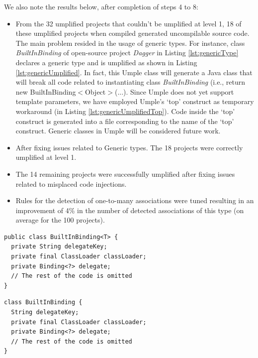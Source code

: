 We also note the results below, after completion of steps 4 to 8:

\begin{itemize}
\item  From the 32 umplified projects that couldn't be umplified at level 1, 18 of these umplified projects when compiled generated uncompilable source code. The main problem resided in the usage of generic types. For instance, class \textit{BuiltInBinding} of open-source project \textit{Dagger} in Listing \ref{lst:genericType} declares a generic type and is umplified as shown in Listing \ref{lst:genericUmplified}. In fact, this Umple class will generate a Java class that will break all code related to instantiating class \textit{BuiltInBinding} (i.e., return new BuiltInBinding$<$Object$>$(...).
Since Umple does not yet support template parameters, we have employed Umple's `top' construct as temporary workaround (in Listing \ref{lst:genericUmplifiedTop}). Code inside the `top' construct is generated into a file corresponding to the name of the `top' construct. Generic classes in Umple will be considered future work.

\item After fixing issues related to Generic types. The 18 projects were correctly umplified at level 1.

\item The 14 remaining projects were successfully umplified after fixing issues related to misplaced code injections.

\item Rules for the detection of one-to-many associations were tuned resulting in an improvement of 4\% in the number of detected associations of this type (on average for the 100 projects).
\end{itemize}

\begin{lstlisting}[style=java, caption=BuiltInBinding.java, label=lst:genericType]
public class BuiltInBinding<T> {
  private String delegateKey;
  private final ClassLoader classLoader;
  private Binding<?> delegate;
  // The rest of the code is omitted
}
\end{lstlisting}

\begin{lstlisting}[style=umpleIn, caption=BuiltInBinding.ump (Invalid), label=lst:genericUmplified]
class BuiltInBinding {
  String delegateKey;
  private final ClassLoader classLoader;
  private Binding<?> delegate;
  // The rest of the code is omitted
}
\end{lstlisting}

